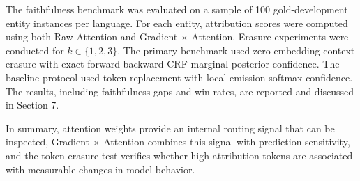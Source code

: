 \documentclass[pdflatex,sn-mathphys-num]{sn-jnl}
\begin{document}
The faithfulness benchmark was evaluated on a sample of 100 gold-development entity instances per language. For each entity, attribution scores were computed using both Raw Attention and Gradient $\times$ Attention. Erasure experiments were conducted for $k \in \{1, 2, 3\}$. The primary benchmark used zero-embedding context erasure with exact forward-backward CRF marginal posterior confidence. The baseline protocol used token replacement with local emission softmax confidence. The results, including faithfulness gaps and win rates, are reported and discussed in Section 7.

In summary, attention weights provide an internal routing signal that can be inspected, Gradient $\times$ Attention combines this signal with prediction sensitivity, and the token-erasure test verifies whether high-attribution tokens are associated with measurable changes in model behavior.
\end{document}
